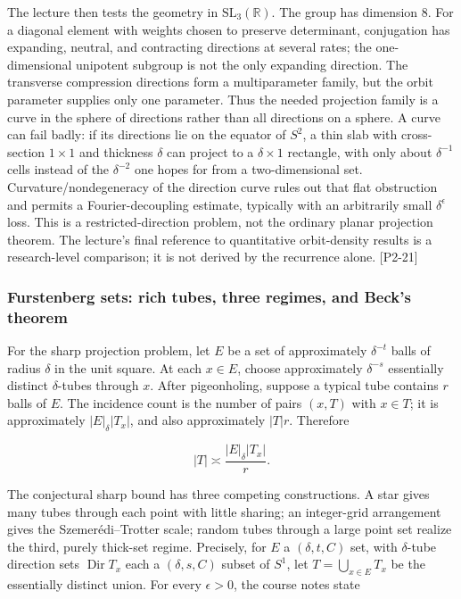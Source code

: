 The lecture then tests the geometry in \(\mathrm{SL}_3(\mathbb R)\). The group has dimension \(8\). For a diagonal element with weights chosen to preserve determinant, conjugation has expanding, neutral, and contracting directions at several rates; the one-dimensional unipotent subgroup is not the only expanding direction. The transverse compression directions form a multiparameter family, but the orbit parameter supplies only one parameter. Thus the needed projection family is a curve in the sphere of directions rather than all directions on a sphere. A curve can fail badly: if its directions lie on the equator of \(S^2\), a thin slab with cross-section \(1\times1\) and thickness \(\delta\) can project to a \(\delta\times1\) rectangle, with only about \(\delta^{-1}\) cells instead of the \(\delta^{-2}\) one hopes for from a two-dimensional set. Curvature/nondegeneracy of the direction curve rules out that flat obstruction and permits a Fourier-decoupling estimate, typically with an arbitrarily small \(\delta^\epsilon\) loss. This is a restricted-direction problem, not the ordinary planar projection theorem. The lecture's final reference to quantitative orbit-density results is a research-level comparison; it is not derived by the recurrence alone. {[}P2-21{]}

\subsubsection{Furstenberg sets: rich tubes, three regimes, and Beck's theorem}\label{04-visual-computing-ii-ch033-furstenberg-sets-rich-tubes-three-regimes-and-becks-theorem}

\hypertarget{04-visual-computing-ii-ch033-furstenberg-sets-rich-tubes-three-regimes-and-becks-theorem}{}

For the sharp projection problem, let \(E\) be a set of approximately \(\delta^{-t}\) balls of radius \(\delta\) in the unit square. At each \(x\in E\), choose approximately \(\delta^{-s}\) essentially distinct \(\delta\)-tubes through \(x\). After pigeonholing, suppose a typical tube contains \(r\) balls of \(E\). The incidence count is the number of pairs \((x,T)\) with \(x\in T\); it is approximately \(|E|_\delta |T_x|\), and also approximately \(|T|r\). Therefore

\[|T|\asymp \frac{|E|_\delta |T_x|}{r}.\]

The conjectural sharp bound has three competing constructions. A star gives many tubes through each point with little sharing; an integer-grid arrangement gives the Szemerédi--Trotter scale; random tubes through a large point set realize the third, purely thick-set regime. Precisely, for \(E\) a \((\delta,t,C)\) set, with \(\delta\)-tube direction sets \(\operatorname{Dir}T_x\) each a \((\delta,s,C)\) subset of \(S^1\), let \(T=\bigcup_{x\in E}T_x\) be the essentially distinct union. For every \(\epsilon>0\), the course notes state

